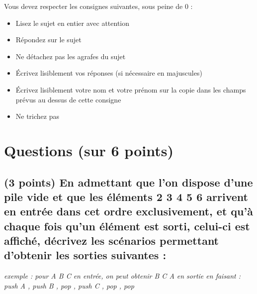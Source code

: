 \documentclass[11pt,a4paper]{article}
\begin{document}
\MakeExamTitleDuree              %


\bigskip

\noindent Vous devez respecter les consignes suivantes, sous peine de 0 :

\begin{itemize}
\item Lisez le sujet en entier avec attention
\item Répondez sur le sujet
\item Ne détachez pas les agrafes du sujet
\item \'Ecrivez lisiblement vos réponses (si nécessaire en majuscules)
\item \'Ecrivez lisiblement votre nom et votre prénom sur la copie \newline
       dans les champs prévus au dessus de cette consigne
\item Ne trichez pas
\end{itemize}


\vfillFirst

\section{Questions (sur 6 points)}


\subsection{(3 points) En admettant que l'on dispose d'une pile vide et que les éléments  2 3 4 5 6 \fg{} arrivent en entrée dans cet ordre exclusivement, et qu'à chaque fois qu'un élément est sorti, celui-ci est affiché, décrivez les scénarios permettant d'obtenir les sorties suivantes : }


\begin{center}
\noindent \textit{exemple : pour \og A B C \fg{} en entrée, on peut obtenir \og B C A \fg{} en sortie en faisant : \linebreak
\og push A \fg, \og push B \fg, \og pop \fg, \og push C \fg, \og pop \fg, \og pop \fg }
\end{center}
\end{document}
